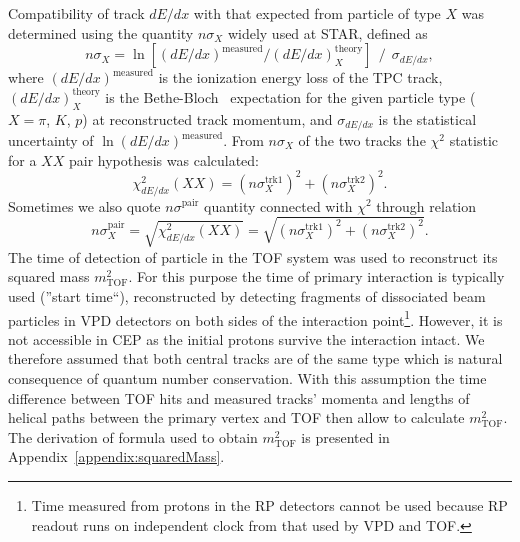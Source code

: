 Compatibility of track $dE/dx$ with that expected from particle of type $X$ was determined using the quantity $n\sigma_{X}$ widely used at STAR, defined as
\protect \begin{equation}\label{eq:nSigmaDef} n\sigma_{X} =  \ln{\left[(dE/dx)^\text{measured} / (dE/dx)_{X}^\text{theory}\right]}~~/~~\sigma_{dE/dx}, \end{equation}
%
where $(dE/dx)^\text{measured}$ is the ionization energy loss of the TPC track, $(dE/dx)_{X}^\text{theory}$ is the Bethe-Bloch~\cite{Bichsel} expectation for the given particle type ($X=\pi$, $K$, $p$) at reconstructed track momentum, and $\sigma_{dE/dx}$ is the statistical uncertainty of $\ln{(dE/dx)^\text{measured}}$. From $n\sigma_{X}$ of the two tracks the $\chi^{2}$ statistic for a $XX$ pair hypothesis was calculated:
%
\begin{equation}\label{eq:chiSqDef}\chi^{2}_{dE/dx}(XX) = \left(n\sigma_{X}^{\text{trk1}}\right)^{2} + \left(n\sigma_{X}^{\text{trk2}}\right)^{2}.\end{equation}
%
Sometimes we also quote $n\sigma^{\text{pair}}$ quantity connected with $\chi^{2}$ through relation
%
\begin{equation}\label{eq:nSigmaPairDef}n\sigma^{\text{pair}}_{X} = \sqrt{\chi^{2}_{dE/dx}(XX)} = \sqrt{\left(n\sigma_{X}^{\text{trk1}}\right)^{2} + \left(n\sigma_{X}^{\text{trk2}}\right)^{2}}.\end{equation}
%
The time of detection of particle in the TOF system was used to reconstruct its squared mass $m^{2}_{\text{TOF}}$. For this purpose the time of primary interaction is typically used (''start time``), reconstructed by detecting fragments of dissociated beam particles in VPD detectors on both sides of the interaction point\footnote{Time measured from protons in the RP detectors cannot be used because RP readout runs on independent clock from that used by VPD and TOF.}. However, it is not accessible in CEP as the initial protons survive the interaction intact. We therefore assumed that both central tracks are of the same type which is natural consequence of quantum number conservation. With this assumption the time difference between TOF hits and measured tracks' momenta and lengths of helical paths between the primary vertex and TOF then allow to calculate $m^{2}_{\text{TOF}}$. The derivation of formula used to obtain $m^{2}_{\text{TOF}}$ is presented in Appendix~\ref{appendix:squaredMass}.

